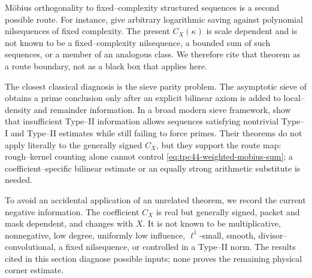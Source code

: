M\"obius orthogonality to fixed--complexity structured sequences is a
second possible route.  For instance, \citet[Theorem~1.1]{GreenTao2012}
give arbitrary logarithmic saving against polynomial nilsequences of
fixed complexity.  The present \(C_X(\kappa)\) is scale dependent and is
not known to be a fixed--complexity nilsequence, a bounded sum of such
sequences, or a member of an analogous class.  We therefore cite that
theorem as a route boundary, not as a black box that applies here.

The closest classical diagnosis is the sieve parity problem.  The
asymptotic sieve of \citet[Theorem~1]{FriedlanderIwaniec1998} obtains a
prime conclusion only after an explicit bilinear axiom is added to
local--density and remainder information.  In a broad modern sieve
framework, \citet[Theorem~2.1]{FordMaynard2024} show that insufficient
Type--II information allows sequences satisfying nontrivial Type--I and
Type--II estimates while still failing to force primes.  Their
theorems do not apply literally to the generally signed \(C_X\), but
they support the route map: rough--kernel counting alone cannot control
\eqref{eq:tpc44-weighted-mobius-sum}; a coefficient--specific bilinear
estimate or an equally strong arithmetic substitute is needed.

To avoid an accidental application of an unrelated theorem, we record
the current negative information.  The coefficient \(C_X\) is real but
generally signed, packet and mask dependent, and changes with \(X\).  It
is not known to be multiplicative, nonnegative, low degree, uniformly
low influence, \(\ell^1\)-small, smooth, divisor--convolutional, a fixed
nilsequence, or controlled in a Type--II norm.  The results cited in this
section diagnose possible inputs; none proves the remaining physical
corner estimate.
